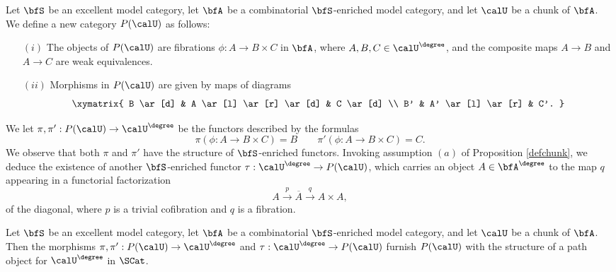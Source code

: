 \begin{notation}
Let $\bfS$ be an excellent model category, let $\bfA$ be a combinatorial
$\bfS$-enriched model category, and let $\calU$ be a chunk of $\bfA$. We
define a new category
$P(\calU)$ as follows:
\begin{itemize}
\item[$(i)$] The objects of $P(\calU)$ are fibrations
$\phi: A \rightarrow B \times C$ in $\bfA$, where 
$A, B, C \in \calU^{\degree}$, and the composite maps
$A \rightarrow B$ and $A \rightarrow C$ are weak equivalences.
\item[$(ii)$] Morphisms in $P(\calU)$ are given by
maps of diagrams
$$ \xymatrix{ B \ar[d] & A \ar[l] \ar[r] \ar[d] & C \ar[d] \\
B' & A' \ar[l] \ar[r] & C'. }$$
\end{itemize}

We let $\pi, \pi': P(\calU) \rightarrow \calU^{\degree}$ be the functors described by the formulas
$$ \pi( \phi: A \rightarrow B \times C) = B \quad \quad \pi'( \phi: A \rightarrow B \times C) = C.$$
We observe that both $\pi$ and $\pi'$ have the structure of $\bfS$-enriched functors.
Invoking assumption $(a)$ of Proposition \ref{defchunk}, we deduce the
existence of another $\bfS$-enriched functor $\tau: \calU^{\degree} \rightarrow P(\calU)$, which
carries an object $A \in \bfA^{\degree}$ to the map $q$ appearing in a functorial
factorization
$$ A \stackrel{p}{\rightarrow} \overline{A} \stackrel{q}{\rightarrow} A \times A,$$
of the diagonal, where $p$ is a trivial cofibration and $q$ is a fibration.
\end{notation}

\begin{theorem}\label{catta}
Let $\bfS$ be an excellent model category, let $\bfA$ be a combinatorial $\bfS$-enriched model category, and let $\calU$ be a chunk of $\bfA$. 
Then the morphisms $\pi, \pi': P(\calU) \rightarrow \calU^{\degree}$ and
$\tau: \calU^{\degree} \rightarrow P(\calU)$
furnish $P(\calU)$ with the structure of a path object for
$\calU^{\degree}$ in $\SCat$.
\end{theorem}

